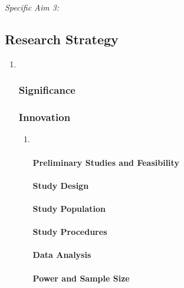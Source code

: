 \emph{Specific Aim 3:}


\subsection{Research Strategy}\label{research-strategy}

\begin{enumerate}
  \item ~

\subsubsection{Significance}\label{significance}

\subsubsection{Innovation}\label{innovation}

\begin{enumerate}
    \item ~
      \paragraph{Preliminary Studies and
      Feasibility}\label{preliminary-studies-and-feasibility}

\paragraph{Study Design}\label{study-design}

\paragraph{Study Population}\label{study-population}

\paragraph{Study Procedures}\label{study-procedures}

\paragraph{Data Analysis}\label{data-analysis}

\paragraph{Power and Sample Size}\label{power-and-sample-size}


\end{enumerate}
\end{enumerate}
